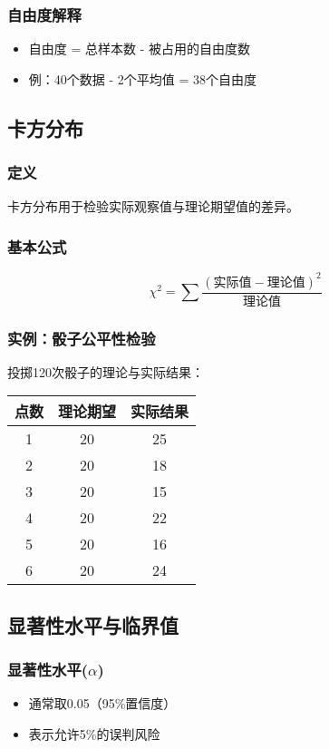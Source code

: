 \subsubsection{自由度解释}
\begin{itemize}
    \item 自由度 = 总样本数 - 被占用的自由度数
    \item 例：40个数据 - 2个平均值 = 38个自由度
\end{itemize}

\subsection{卡方分布}

\subsubsection{定义}
卡方分布用于检验实际观察值与理论期望值的差异。

\subsubsection{基本公式}
\[\chi^2 = \sum \frac{(实际值 - 理论值)^2}{理论值}\]

\subsubsection{实例：骰子公平性检验}
投掷120次骰子的理论与实际结果：

\begin{tabular}{|c|c|c|}
\hline
点数 & 理论期望 & 实际结果 \\
\hline
1 & 20 & 25 \\
2 & 20 & 18 \\
3 & 20 & 15 \\
4 & 20 & 22 \\
5 & 20 & 16 \\
6 & 20 & 24 \\
\hline
\end{tabular}

\subsection{显著性水平与临界值}

\subsubsection{显著性水平($\alpha$)}
\begin{itemize}
    \item 通常取0.05（95\%置信度）
    \item 表示允许5\%的误判风险
\end{itemize}

